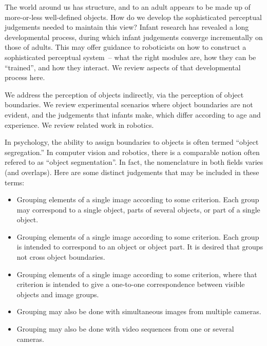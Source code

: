 
The world around us has structure, and to an adult appears to be made
up of more-or-less well-defined objects.  How do we develop the
sophisticated perceptual judgements needed to maintain this view?
%
Infant research has revealed a long developmental process, during
which infant judgements converge incrementally on those of adults.
This may offer guidance to roboticists on how to construct a
sophisticated perceptual system~-- what the right modules are, how
they can be ``trained'', and how they interact.  We review aspects 
of that developmental process here.

We address the perception of objects indirectly, via
the perception of object boundaries.  We review experimental scenarios
where object boundaries are not evident, and the judgements that
infants make, which differ according to age and experience.  We review
related work in robotics.  

In psychology, the ability to assign boundaries to objects is 
often termed
``object segregation.''  In computer vision and robotics, there
is a comparable notion often refered to as ``object segmentation''.
In fact, the nomenclature in both fields varies (and overlaps).
%
Here are some distinct judgements that may be included in these
terms:

\begin{itemize}

\item Grouping elements of a single image according to some
criterion.  Each group may correspond to a single object, parts of
several objects, or part of a single object.

\item Grouping elements of a single image according to some
criterion.  Each group is intended to correspond to an object or
object part.  It is desired that groups not cross object boundaries.

\item Grouping elements of a single image according to some
criterion, where that criterion is intended to give a 
one-to-one correspondence between visible objects and
image groups.

\item Grouping may also be done with simultaneous images from
multiple cameras.

\item Grouping may also be done with video sequences from one or 
several cameras.

\end{itemize}

